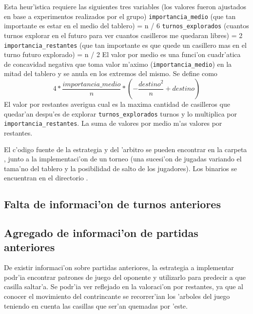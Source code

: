 \begin{algorithmic}[1]
\STATE Esta heur'istica requiere las siguientes tres variables (los valores fueron ajustados en base a experimentos realizados por el grupo)
	\STATE \verb|importancia_medio| (que tan importante es estar en el medio del tablero) = n / 6
	\STATE \verb|turnos_explorados| (cuantos turnos explorar en el futuro para ver cuantos casilleros me quedaran libres) = 2
	\STATE \verb|importancia_restantes| (que tan importante es que quede un casillero mas en el turno futuro explorado) = n / 2
\STATE El valor por medio es una funci'on cuadr'atica de concavidad negativa que toma valor m'aximo (\verb|importancia_medio|) en la mitad del tablero y se anula en los extremos del mismo. Se define como
	$$4 * \frac{importancia\_medio}{n} * \left(-\frac{destino^2}{n} + destino\right)$$
\STATE El valor por restantes averigua cual es la maxima cantidad de casilleros que quedar'an despu'es de explorar \verb|turnos_explorados| turnos y lo multiplica por \verb|importancia_restantes|.
\RETURN La suma de valores por medio m'as valores por restantes.
\end{algorithmic}

\vspace{1em}

El c'odigo fuente de la estrategia y  del 'arbitro se pueden encontrar en la carpeta , junto a la implementaci'on de un torneo (una sucesi'on de jugadas variando el tama'no del tablero y la posibilidad de salto de los jugadores). Los binarios se encuentran en el directorio .



\subsection{Falta de informaci'on de turnos anteriores}


\subsection{Agregado de informaci'on de partidas anteriores}
De existir informaci'on sobre partidas anteriores, la estrategia a implementar podr'ia encontrar patrones de juego del oponente y utilizarlo para predecir a que casilla saltar'a. Se podr'ia ver reflejado en la valoraci'on por restantes, ya que al conocer el movimiento del contrincante se recorrer'ian los 'arboles del juego teniendo en cuenta las casillas que ser'an quemadas por 'este.


